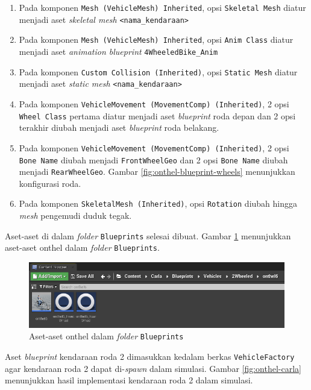 \begin{enumerate}
    \item Pada komponen \verb|Mesh (VehicleMesh) Inherited|, opsi \verb|Skeletal Mesh|
    diatur menjadi aset \textit{skeletal mesh} \verb|<nama_kendaraan>|
    \item Pada komponen \verb|Mesh (VehicleMesh) Inherited|, opsi \verb|Anim Class|
    diatur menjadi aset \textit{animation blueprint} \verb|4WheeledBike_Anim|
    \item Pada komponen \verb|Custom Collision (Inherited)|, opsi \verb|Static Mesh|
    diatur menjadi aset \textit{static mesh} \verb|<nama_kendaraan>|
    \item Pada komponen \verb|VehicleMovement (MovementComp) (Inherited)|, 2
    opsi \verb|Wheel Class| pertama diatur menjadi aset \textit{blueprint} roda
    depan dan 2 opsi terakhir diubah menjadi aset \textit{blueprint} roda
    belakang.
    \item Pada komponen \verb|VehicleMovement (MovementComp) (Inherited)|, 2
    opsi \verb|Bone Name| diubah menjadi \verb|FrontWheelGeo| dan 2 opsi
    \verb|Bone Name| diubah menjadi \verb|RearWheelGeo|. Gambar
    \ref{fig:onthel-blueprint-wheels} menunjukkan konfigurasi roda.
    \item Pada komponen \verb|SkeletalMesh (Inherited)|, opsi \verb|Rotation|
    diubah hingga \textit{mesh} pengemudi duduk tegak.
\end{enumerate}

Aset-aset di dalam \textit{folder} \verb|Blueprints| selesai dibuat. Gambar
\ref{fig:onthel-assets-in-blueprints-folder} menunjukkan aset-aset onthel dalam
\textit{folder} \verb|Blueprints|.

\begin{figure}[!h]
    \centering
    \includegraphics[width=1\textwidth]{resources/chapter-4/onthel-assets-in-blueprints-folder.png}
    \caption{Aset-aset onthel dalam \textit{folder} \texttt{Blueprints}}
    \label{fig:onthel-assets-in-blueprints-folder}
\end{figure}

Aset \textit{blueprint} kendaraan roda 2 dimasukkan kedalam berkas
\verb|VehicleFactory| agar kendaraan roda 2 dapat di-\textit{spawn} dalam
simulasi. Gambar \ref{fig:onthel-carla} menunjukkan hasil implementasi kendaraan
roda 2 dalam simulasi.

